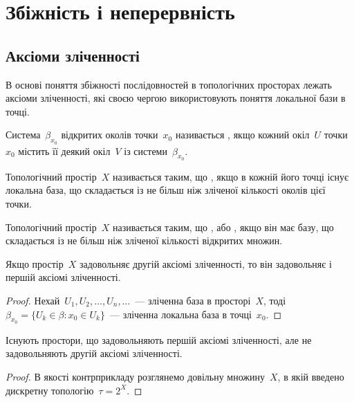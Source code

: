 \chapter{Збіжність і неперервність}

\section{Аксіоми зліченності}

В основі поняття збіжності послідовностей в
топологічних просторах лежать аксіоми зліченності, які своєю чергою використовують поняття локальної бази в точці.

\begin{definition}
Система~$\beta_{x_0}$ відкритих околів точки~$x_0$
називається , якщо кожний
окіл~$U$ точки~$x_0$ містить її деякий окіл~$V$ із системи~$\beta_{x_0}$.
\end{definition}

\begin{definition}
Топологічний простір~$X$ називається таким, що
, якщо в кожній
його точці існує локальна база, що складається із не більш
ніж зліченої кількості околів цієї точки.
\end{definition}

\begin{definition}
Топологічний простір~$X$ називається таким, що
, або , якщо він має базу, що складається із не
більш ніж зліченої кількості відкритих множин.
\end{definition}

\begin{lemma}
Якщо простір~$X$ задовольняє другій аксіомі
зліченності, то він задовольняє і першій аксіомі
зліченності.
\end{lemma}

\begin{proof}
Нехай~$U_1, U_2, \ldots, U_n, \ldots$~--- зліченна база в
просторі~$X$, тоді~$\beta_{x_0} = \{ U_k \in \beta: x_0 \in U_k \}$~--- зліченна локальна
база в точці~$x_0$.
\end{proof}

\begin{lemma}
Існують простори, що задовольняють першій
аксіомі зліченності, але не задовольняють другій аксіомі
зліченності.
\end{lemma}

\begin{proof}
В якості контрприкладу розглянемо
довільну  множину~$X$, в якій введено дискретну
топологію~$\tau = 2^X$.
\end{proof}

